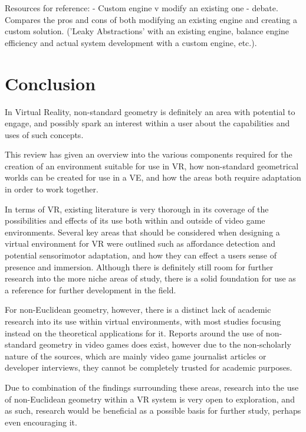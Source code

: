 		Resources for reference:
		\cite{Bruce2012} - Custom engine v modify an existing one - debate. Compares the pros and cons of both modifying an existing engine and creating a custom solution. ('Leaky Abstractions' with an existing engine, balance engine efficiency and actual system development with a custom engine, etc.).

	\section{Conclusion}
	\label{lr:conclusion}

		In Virtual Reality, non-standard geometry is definitely an area with potential to engage, and possibly spark an interest within a user about the capabilities and uses of such concepts.

		This review has given an overview into the various components required for the creation of an environment suitable for use in VR, how non-standard geometrical worlds can be created for use in a VE, and how the areas both require adaptation in order to work together.

		In terms of VR, existing literature is very thorough in its coverage of the possibilities and effects of its use both within and outside of video game environments.
		Several key areas that should be considered when designing a virtual environment for VR were outlined such as affordance detection and potential sensorimotor adaptation, and how they can effect a users sense of presence and immersion.
		Although there is definitely still room for further research into the more niche areas of study, there is a solid foundation for use as a reference for further development in the field.

		For non-Euclidean geometry, however, there is a distinct lack of academic research into its use within virtual environments, with most studies focusing instead on the theoretical applications for it.
		Reports around the use of non-standard geometry in video games does exist, however due to the non-scholarly nature of the sources, which are mainly video game journalist articles or developer interviews, they cannot be completely trusted for academic purposes.

		Due to combination of the findings surrounding these areas, research into the use of non-Euclidean geometry within a VR system is very open to exploration, and as such, research would be beneficial as a possible basis for further study, perhaps even encouraging it.
